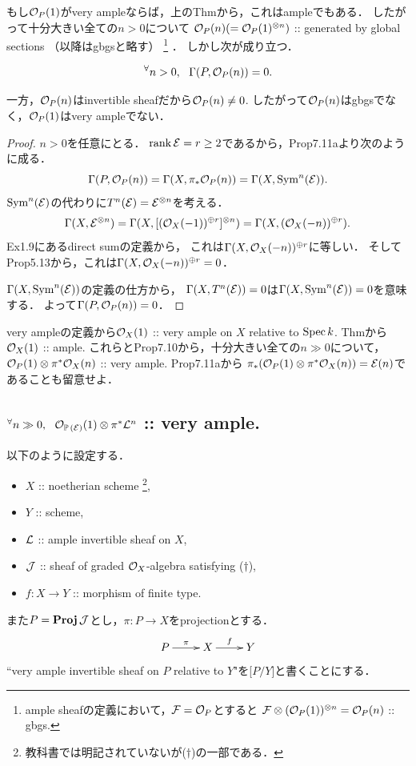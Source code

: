 \documentclass[a4paper]{jsarticle}
\newcommand{\Sym}{\operatorname{Sym}}
\newcommand{\gProj}{\mathbf{Proj}\,}
\newcommand{\pbundle}{\mathbb{P}\,}
\begin{document}
    もし$\mathcal{O}_P(1)$がvery ampleならば，上のThmから，これはampleでもある．
    したがって十分大きい全ての$n>0$について
    $\mathcal{O}_P(n)(=\mathcal{O}_P(1)^{\otimes n})$ :: generated by global sections （以降はgbgsと略す）
    \footnote
    {
        ample sheafの定義において，$\mathcal{F}=\mathcal{O}_P$とすると
        $\mathcal{F} \otimes (\mathcal{O}_P(1))^{\otimes n}=\mathcal{O}_P(n)$ :: gbgs.
    }
    ．
    しかし次が成り立つ．
    \begin{Claim}
        \[ {}^{\forall} n>0,~~ \Gamma(P, \mathcal{O}_P(n))=0. \]
    \end{Claim}
    一方，$\mathcal{O}_P(n)$はinvertible sheafだから$\mathcal{O}_P(n) \neq 0$.
    したがって$\mathcal{O}_P(n)$はgbgsでなく，$\mathcal{O}_P(1)$はvery ampleでない．
    \begin{proof}
        $n>0$を任意にとる．
        $\operatorname{rank} \mathcal{E}=r \geq 2$であるから，Prop7.11aより次のように成る．
        \[ \Gamma(P, \shO_P(n))=\Gamma(X, \pi_*\shO_P(n))=\Gamma(X, \Sym^n(\shE)). \]
        $\Sym^n(\shE)$の代わりに$T^n(\mathcal{E})=\mathcal{E}^{\otimes n}$を考える．
        \[
            \Gamma(X, \mathcal{E}^{\otimes n})
            =\Gamma(X, [(\mathcal{O}_X(-1))^{\oplus r}]^{\otimes n})
            =\Gamma(X, (\mathcal{O}_X(-n))^{\oplus r}).
        \]
        Ex1.9にあるdirect sumの定義から，
        これは$\Gamma(X, \mathcal{O}_X(-n))^{\oplus r}$に等しい．
        そしてProp5.13から，これは$\Gamma(X, \mathcal{O}_X(-n))^{\oplus r}=0$．

        $\Gamma(X, \Sym^n(\shE))$の定義の仕方から，
        $\Gamma(X, T^n(\mathcal{E}))=0$は$\Gamma(X, \Sym^n(\shE))=0$を意味する．
        よって$\Gamma(P, \mathcal{O}_P(n))=0$．
    \end{proof}

    \begin{Remark}
        very ampleの定義から$\mathcal{O}_X(1)$ :: very ample on $X$ relative to $\operatorname{Spec} k$.
        Thmから$\mathcal{O}_X(1)$ :: ample.
        これらとProp7.10から，十分大きい全ての$n \gg 0$について，
        $\mathcal{O}_P(1) \otimes \pi^* \mathcal{O}_X(n)$ :: very ample.
        Prop7.11aから
        $\pi_*(\mathcal{O}_P(1) \otimes \pi^* \mathcal{O}_X(n))=\mathcal{E}(n)$であることも留意せよ．
    \end{Remark}

    \subsection{$\Forall{n \gg 0} \shO_{\pbundle(\shE)}(1) \otimes \pi^* \shL^n$ :: very ample.}
    以下のように設定する．
    \begin{itemize}
        \item $X$ :: noetherian scheme
            \footnote{ 教科書では明記されていないが($\dagger$)の一部である．},
        \item $Y$ :: scheme,
        \item $\mathcal{L}$ :: ample invertible sheaf on $X$,
        \item $\mathcal{J}$ :: sheaf of graded $\mathcal{O}_X$-algebra satisfying ($\dagger$),
        \item $f: X \to Y$ :: morphism of finite type.
    \end{itemize}
    また$P=\gProj \shJ$とし，$\pi: P \to X$をprojectionとする．
    \[
        \xymatrix
        {
            P \ar[r]^-{\pi}& X \ar[r]^-{f}& Y
        }
    \]
    ``very ample invertible sheaf on $P$ relative to $Y$"を[$P/Y$]と書くことにする．
\end{document}
